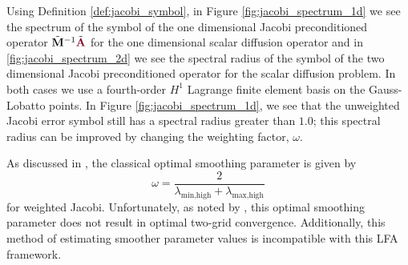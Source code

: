 Using Definition \ref{def:jacobi_symbol}, in Figure \ref{fig:jacobi_spectrum_1d} we see the spectrum of the symbol of the one dimensional Jacobi preconditioned operator $\tilde{\mathbf{M}}^{-1} \tilde{{\color{burgundy}\mathbf{A}}}$ for the one dimensional scalar diffusion operator and in \ref{fig:jacobi_spectrum_2d} we see the spectral radius of the symbol of the two dimensional Jacobi preconditioned operator for the scalar diffusion problem.
In both cases we use a fourth-order $H^1$ Lagrange finite element basis on the Gauss-Lobatto points.
In Figure \ref{fig:jacobi_spectrum_1d}, we see that the unweighted Jacobi error symbol still has a spectral radius greater than $1.0$; this spectral radius can be improved by changing the weighting factor, $\omega$.

As discussed in \cite{he2020two}, the classical optimal smoothing parameter is given by
\begin{equation}
\omega = \frac{2}{\lambda_{\text{min}, \text{high}} + \lambda_{\text{max}, \text{high}}}
\end{equation}
for weighted Jacobi.
Unfortunately, as noted by \cite{he2020two}, this optimal smoothing parameter does not result in optimal two-grid convergence.
Additionally, this method of estimating smoother parameter values is incompatible with this LFA framework.